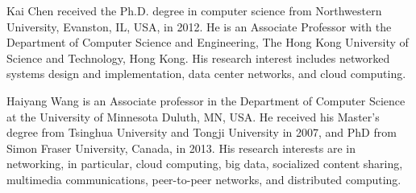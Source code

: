 \documentclass[10pt,journal,compsoc]{IEEEtran}
\begin{document}
\begin{IEEEbiography}
{Kai Chen} received the Ph.D. degree in computer science from Northwestern University, Evanston, IL, USA, in 2012. He is an Associate Professor with the Department of Computer Science and Engineering, The Hong Kong University of Science and Technology, Hong Kong. His research interest includes networked systems design and implementation, data center networks, and cloud computing.
\end{IEEEbiography}

\begin{IEEEbiography}
{Haiyang Wang} is an Associate professor in the Department of Computer Science at the University of Minnesota Duluth, MN, USA. He received his Master's degree from Tsinghua University and Tongji University in 2007, and PhD from Simon Fraser University, Canada, in 2013. His research interests are in networking, in particular, cloud computing, big data, socialized content sharing, multimedia communications, peer-to-peer networks, and distributed computing.
\end{IEEEbiography}
\end{document}
